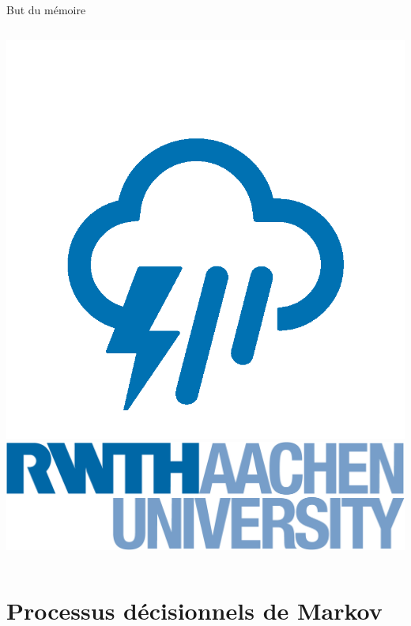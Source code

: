 \documentclass[compress]{beamer}
\theoremstyle{theorem}%
\begin{document}
\begin{frame}{But du mémoire}
\begin{columns}
\begin{column}{0.2\linewidth}
          \includegraphics[width=\linewidth]{resources/storm}\\
          \includegraphics[width=\linewidth]{resources/rwth}
      \end{column}
    \end{columns}
\end{frame}

\section{Processus décisionnels de Markov}
\end{document}
